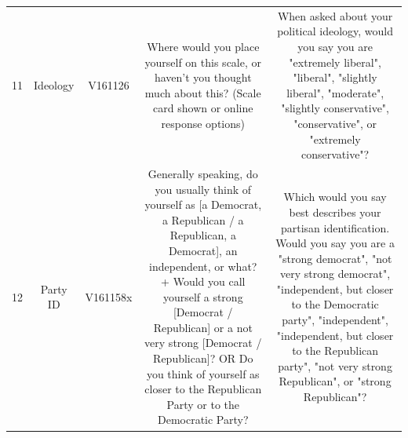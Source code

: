\documentclass[11pt]{article}
\begin{document}
\begin{longtable}{ccccc}
    \multirow{9}{2em}{11} & \multirow{9}{4.5em}{Ideology} & \multirow{9}{4em}{V161126} & \multirow{9}{12em}{Where would you place yourself on this scale, or haven’t you thought much about this? (Scale card shown or online response options)} & \multirow{9}{12em}{When asked about your political ideology, would you say you are "extremely liberal", "liberal", "slightly liberal", "moderate", "slightly conservative", "conservative", or "extremely conservative"?}\\&&&&\\&&&&\\&&&&\\&&&&\\&&&&\\&&&&\\&&&&\\&&&&\\
    \hline

    \multirow{15}{2em}{12} & \multirow{15}{4.5em}{Party ID} & \multirow{15}{4em}{V161158x} & \multirow{15}{12em}{Generally speaking, do you usually think of yourself as [a Democrat, a Republican / a Republican, a Democrat], an independent, or what? +  Would you call yourself a strong [Democrat / Republican] or a not very strong [Democrat / Republican]? OR Do you think of yourself as closer to the Republican Party or to the Democratic Party?} & \multirow{15}{12em}{Which would you say best describes your partisan identification. Would you say you are a "strong democrat", "not very strong democrat", "independent, but closer to the Democratic party", "independent", "independent, but closer to the Republican party", "not very strong Republican", or "strong Republican"?}\\&&&&\\&&&&\\&&&&\\&&&&\\&&&&\\&&&&\\&&&&\\&&&&\\&&&&\\&&&&\\&&&&\\&&&&\\&&&&\\&&&&
    \label{tab:questionwording}
\end{longtable}
\end{document}

